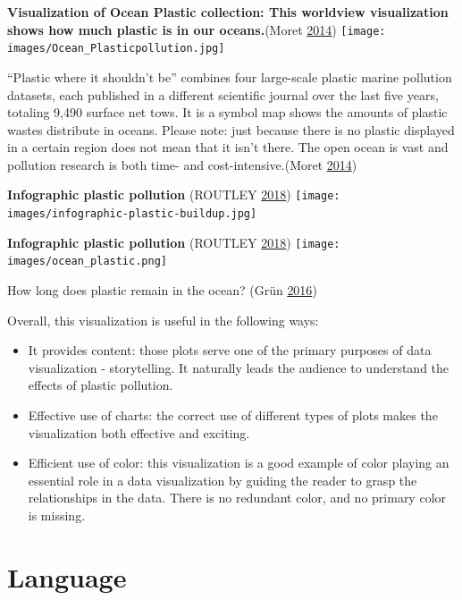 \documentclass[]{book}
\providecommand{\tightlist}{%
  \setlength{\itemsep}{0pt}\setlength{\parskip}{0pt}}
\begin{document}
\textbf{Visualization of Ocean Plastic collection: This worldview visualization shows how much plastic is in our oceans.}(Moret \protect\hyperlink{ref-ocean_plastic_pollution}{2014})
\texttt{[image: images/Ocean\_Plasticpollution.jpg]}

``Plastic where it shouldn't be'' combines four large-scale plastic marine pollution datasets, each published in a different scientific journal over the last five years, totaling 9,490 surface net tows. It is a symbol map shows the amounts of plastic wastes distribute in oceans. Please note: just because there is no plastic displayed in a certain region does not mean that it isn't there. The open ocean is vast and pollution research is both time- and cost-intensive.(Moret \protect\hyperlink{ref-ocean_plastic_pollution}{2014})

\textbf{Infographic plastic pollution} (ROUTLEY \protect\hyperlink{ref-plastic_pollution_infographics}{2018})
\texttt{[image: images/infographic-plastic-buildup.jpg]}

\textbf{Infographic plastic pollution} (ROUTLEY \protect\hyperlink{ref-plastic_pollution_infographics}{2018})
\texttt{[image: images/ocean\_plastic.png]}

How long does plastic remain in the ocean? (Grün \protect\hyperlink{ref-plastic_pollution_visualizations}{2016})

Overall, this visualization is useful in the following ways:

\begin{itemize}
\tightlist
\item
  It provides content: those plots serve one of the primary purposes of data visualization - storytelling. It naturally leads the audience to understand the effects of plastic pollution.
\item
  Effective use of charts: the correct use of different types of plots makes the visualization both effective and exciting.
\item
  Efficient use of color: this visualization is a good example of color playing an essential role in a data visualization by guiding the reader to grasp the relationships in the data. There is no redundant color, and no primary color is missing.
\end{itemize}

\hypertarget{language}{%
\section{Language}\label{language}}
\end{document}
